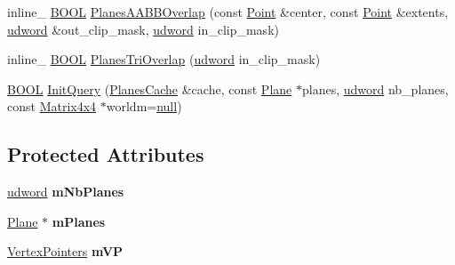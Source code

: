 \begin{DoxyCompactItemize}
\item 
inline\+\_\+ \hyperlink{_ice_types_8h_a050c65e107f0c828f856a231f4b4e788}{B\+O\+O\+L} \hyperlink{class_planes_collider_a008b6f353c9ef7d2c05cb0d317fdb044}{Planes\+A\+A\+B\+B\+Overlap} (const \hyperlink{class_point}{Point} \&center, const \hyperlink{class_point}{Point} \&extents, \hyperlink{_ice_types_8h_a44c6f1920ba5551225fb534f9d1a1733}{udword} \&out\+\_\+clip\+\_\+mask, \hyperlink{_ice_types_8h_a44c6f1920ba5551225fb534f9d1a1733}{udword} in\+\_\+clip\+\_\+mask)
\item 
inline\+\_\+ \hyperlink{_ice_types_8h_a050c65e107f0c828f856a231f4b4e788}{B\+O\+O\+L} \hyperlink{class_planes_collider_ab03f027205fd51e49c642d667b115654}{Planes\+Tri\+Overlap} (\hyperlink{_ice_types_8h_a44c6f1920ba5551225fb534f9d1a1733}{udword} in\+\_\+clip\+\_\+mask)
\item 
\hyperlink{_ice_types_8h_a050c65e107f0c828f856a231f4b4e788}{B\+O\+O\+L} \hyperlink{class_planes_collider_adcbda746fa3c556889fb64ba56f38cd0}{Init\+Query} (\hyperlink{struct_planes_cache}{Planes\+Cache} \&cache, const \hyperlink{class_plane}{Plane} $\ast$planes, \hyperlink{_ice_types_8h_a44c6f1920ba5551225fb534f9d1a1733}{udword} nb\+\_\+planes, const \hyperlink{class_matrix4x4}{Matrix4x4} $\ast$worldm=\hyperlink{_ice_types_8h_ac97b8ee753e4405397a42ad5799b0f9e}{null})
\end{DoxyCompactItemize}
\subsection*{Protected Attributes}
\begin{DoxyCompactItemize}
\item 
\hypertarget{class_planes_collider_ada2d9d9d4f1ae3a3a3a09d6fcfc8ab75}{\hyperlink{_ice_types_8h_a44c6f1920ba5551225fb534f9d1a1733}{udword} {\bfseries m\+Nb\+Planes}}\label{class_planes_collider_ada2d9d9d4f1ae3a3a3a09d6fcfc8ab75}

\item 
\hypertarget{class_planes_collider_ad31d6c1211dabb827ffcd59af1e14a25}{\hyperlink{class_plane}{Plane} $\ast$ {\bfseries m\+Planes}}\label{class_planes_collider_ad31d6c1211dabb827ffcd59af1e14a25}

\item 
\hypertarget{class_planes_collider_a3b4884a9474c29da9b95c20ebeee0840}{\hyperlink{struct_vertex_pointers}{Vertex\+Pointers} {\bfseries m\+V\+P}}\label{class_planes_collider_a3b4884a9474c29da9b95c20ebeee0840}

\end{DoxyCompactItemize}


